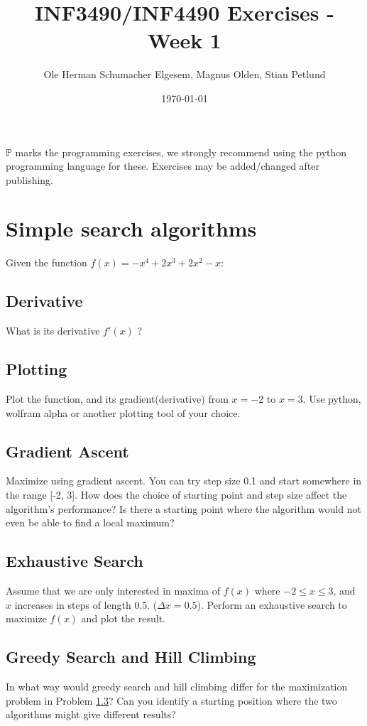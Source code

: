 \documentclass{article}           %
\title{\vspace{-2cm}INF3490/INF4490 Exercises - Week 1}
\author{Ole Herman Schumacher Elgesem, Magnus Olden, Stian Petlund}
\date{\today}
\newcommand\marginsymbol[1][0pt]{%
  \tabto*{0cm}\makebox[\dimexpr-1cm-#1\relax][r]{$\mathbb{P}$}\tabto*{\TabPrevPos}}
\begin{document}
    \renewcommand\marginsymbol[1][0pt]{%
  \tabto*{0cm}\makebox[-1cm][c]{$\mathbb{P}$}\tabto*{\TabPrevPos}}

\maketitle
\(\mathbb{P}\) marks the programming exercises, we strongly recommend using
the python programming language for these. Exercises may be added/changed
after publishing.

\section{Simple search algorithms}

Given the function \(f(x) = -x^4 + 2x^3 + 2x^2 - x\):

\subsection{Derivative}
What is its derivative \(f'(x)\) ?

\subsection{Plotting \marginsymbol}
Plot the function, and its gradient(derivative) from \(x=-2\) to \(x=3\). Use
python, wolfram alpha or another plotting tool of your choice.

\subsection{Gradient Ascent \marginsymbol}
\label{subsec:grada}
Maximize using gradient ascent. You can try step size 0.1 and start somewhere
in the range [-2, 3]. How does the choice of starting point and step size
affect the algorithm's performance? Is there a starting point where the
algorithm would not even be able to find a local maximum?

\subsection{Exhaustive Search \marginsymbol}
\label{subsec:exhaust}
Assume that we are only interested in maxima of \(f(x)\) where
\(-2\leq x \leq 3\), and \(x\) increases in steps of length 0.5.
(\(\Delta x = 0.5\)). Perform an exhaustive search to
maximize \(f(x)\) and plot the result.

\subsection{Greedy Search and Hill Climbing}
In what way would greedy search and hill climbing differ for the
maximization problem in Problem \ref{subsec:grada}? Can you identify a starting position
where the two algorithms might give different results?
\end{document}
